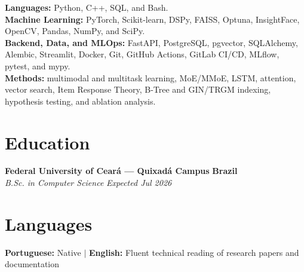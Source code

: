 \documentclass[a4paper,10pt]{article}
\newcommand{\entry}[4]{%
    \noindent
    \textbf{#1}
    \hfill
    \textbf{#2}\\[-1pt]
    \textit{#3}
    \hfill
    \textit{#4}\par
}
\begin{document}
\textbf{Languages:}
Python, C++, SQL, and Bash.\\[1pt]

\textbf{Machine Learning:}
PyTorch, Scikit-learn, DSPy, FAISS, Optuna, InsightFace, OpenCV,
Pandas, NumPy, and SciPy.\\[1pt]

\textbf{Backend, Data, and MLOps:}
FastAPI, PostgreSQL, pgvector, SQLAlchemy, Alembic, Streamlit, Docker,
Git, GitHub Actions, GitLab CI/CD, MLflow, pytest, and mypy.\\[1pt]

\textbf{Methods:}
multimodal and multitask learning, MoE/MMoE, LSTM, attention,
vector search, Item Response Theory, B-Tree and GIN/TRGM indexing,
hypothesis testing, and ablation analysis.

\section*{Education}

\entry
    {Federal University of Ceará --- Quixadá Campus}
    {Brazil}
    {B.Sc. in Computer Science}
    {Expected Jul 2026}

\section*{Languages}

\textbf{Portuguese:} Native
\enspace $|$ \enspace
\textbf{English:} Fluent technical reading of research papers and
documentation
\end{document}
